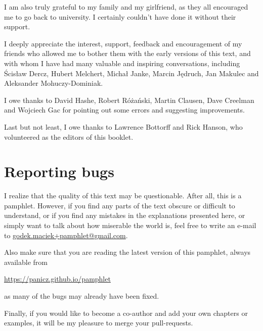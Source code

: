 I am also truly grateful to my family and my girlfriend,
as they all encouraged me to go back to university. I certainly
couldn't have done it without their support.

I deeply appreciate the interest, support, feedback and
encouragement of my friends who allowed me to bother them with
the early versions of this text, and with whom I have had many
valuable and inspiring conversations, including Ścisław Dercz,
Hubert Melchert, Michał Janke, Marcin Jędruch, Jan Makulec
and Aleksander Mohuczy-Dominiak. 

I owe thanks to David Hashe, Robert Różański, Martin Clausen,
Dave Creelman and Wojciech Gac for pointing out some errors and suggesting
improvements.

Last but not least, I owe thanks to Lawrence Bottorff and Rick Hanson,
who volunteered as the editors of this booklet.

\section*{Reporting bugs}

I realize that the quality of this text may be questionable.
After all, this is a pamphlet. However, if you find any parts
of the text obscure or difficult to understand, or if you
find any mistakes in the explanations presented here, or
simply want to talk about how miserable the world is, feel
free to write an e-mail to
\href{mailto:godek.maciek+pamphlet@gmail.com}{godek.maciek+pamphlet@gmail.com}.

Also make sure that you are reading the latest version
of this pamphlet, always available from

\url{https://panicz.github.io/pamphlet}

\noindent as many of the bugs may already have been fixed.

Finally, if you would like to become a co-author and add your
own chapters or examples, it will be my pleasure to merge your
pull-requests.
